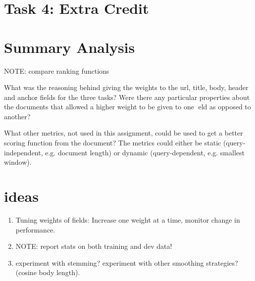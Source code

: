 \documentclass[10pt,twocolumn]{article}
\begin{document}
\section*{Task 4: Extra Credit}

\section{Summary Analysis}
NOTE: compare ranking functions

What was the reasoning behind giving the weights to the url, title,
body, header and anchor fields for the three tasks? Were there any
particular properties about the documents that allowed a higher weight
to be given to one eld as opposed to another?

What other metrics, not used in this assignment, could be used to
get a better scoring function from the document? The metrics could
either be static (query-independent, e.g. document length) or dynamic
(query-dependent, e.g. smallest window).

\section{ideas}
\begin{enumerate}
\item 
Tuning weights of fields: Increase one weight at a time, monitor change in performance.
\item
NOTE: report stats on both training and dev data!
\item 
experiment with stemming? experiment with other smoothing strategies?(cosine body length).
\end{enumerate}
\end{document}

